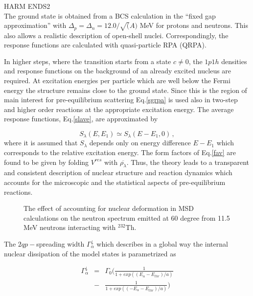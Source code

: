 \documentclass[twocolumn,amsmath,amssymb,10pt,groupedaddress,a4paper]{revtex4}
\begin{document}
HARM ENDS2\\

The ground state is obtained from a BCS calculation
in the {}``fixed gap approximation'' with $\Delta_{p}=\Delta_{n}=12.0/\sqrt{(}A)$
MeV for protons and neutrons. This also allows a realistic description
of open-shell nuclei. Correspondingly, the response functions are
calculated with quasi-particle RPA (QRPA).

In higher steps, where the transition starts from a state $c\not=0$,
the $1p1h$ densities and response functions on the background of
an already excited nucleus are required. At excitation energies per
particle which are well below the Fermi energy the structure remains
close to the ground state. Since this is the region of main interest
for pre-equilibrium scattering Eq.\ref{sgrpa} is used also in two-step
and higher order reactions at the appropriate excitation energy. The
average response functions, Eq.\ref{slave}, are approximated by

\begin{equation}
S_{\lambda}(E,E_{1})\simeq S_{\lambda}(E-E_{1},0)\,,\label{slrpa}
\end{equation}
\noindent where it is assumed that $S_{\lambda}$ depends only on energy difference
$E-E_{1}$ which corresponds to the relative excitation energy. The
form factors of Eq.\ref{fav} are found to be given by folding $V^{res}$
with $\overline{\rho_{\lambda}}$. Thus, the theory leads to a transparent
and consistent description of nuclear structure and reaction dynamics
which accounts for the microscopic and the statistical aspects of
pre-equilibrium reactions.


\begin{figure}[htbp]
\caption{The effect of accounting for nuclear deformation in MSD calculations on the neutron spectrum emitted at 60 degree from 11.5 MeV neutrons interacting with $^{232}$Th.}
\label{fig:Th-defMSD}
\end{figure}


The $2qp-$spreading width $\Gamma_{\alpha}^{\downarrow}$ which describes
in a global way the internal nuclear dissipation of the model states
is parametrized as

\begin{eqnarray}
\Gamma_{\alpha}^{\downarrow}&=&\Gamma_{0}(\frac{1}{1+exp((E_{\alpha}-E_{thr})/a)} \nonumber \\ &-&\frac{1}{1+exp((-E_{\alpha}-E_{thr})/a)})
\end{eqnarray}
\end{document}
